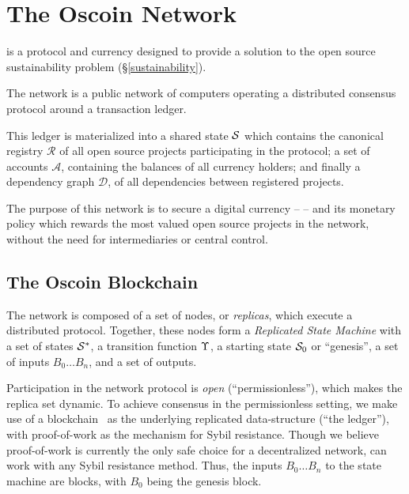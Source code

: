 \section{The Oscoin Network}



\noindent \oscoin{} is a protocol and currency designed to provide a solution
to the open source sustainability problem (\S \ref{sustainability}).

The \oscoin{} network is a public network of computers operating a distributed
consensus protocol around a transaction ledger.

This ledger is materialized into a shared state $\mathcal{S}$ which contains the
canonical registry $\mathcal{R}$ of all open source projects participating in
the \oscoin{} protocol; a set of accounts $\mathcal{A}$, containing the
balances of all currency holders; and finally a  dependency graph
$\mathcal{D}$, of all dependencies between registered projects.

The purpose of this network is to secure a digital currency -- \oscoin{} -- and
its monetary policy which rewards the most valued open source projects in the
network, without the need for intermediaries or central control.

\subsection{The Oscoin Blockchain}

The \oscoin{} network is composed of a set of nodes, or \emph{replicas}, which
execute a distributed protocol. Together, these nodes form a \emph{Replicated
State Machine} with a set of states $\mathcal{S}^*$, a transition function $\Upsilon$,
a starting state $\mathcal{S}_0$ or ``genesis'', a set of inputs $B_0 \dotso B_n$,
and a set of outputs.

Participation in the network protocol is \emph{open} (\ie ``permissionless''),
which makes the replica set dynamic. To achieve consensus in the permissionless
setting, we make use of a blockchain~\cite{bitcoin} as the underlying
replicated data-structure (``the ledger''), with proof-of-work as the mechanism
for Sybil resistance. Though we believe proof-of-work is currently the only
safe choice for a decentralized network, \oscoin{} can work with any Sybil
resistance method. Thus, the inputs $B_0 \dotso B_n$ to the state machine are
blocks, with $B_0$ being the genesis block.

